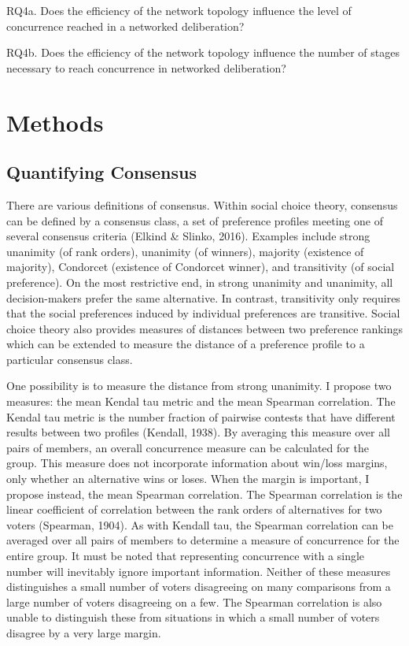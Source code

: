 RQ4a. Does the efficiency of the network topology influence the level of concurrence reached in a networked deliberation?

RQ4b. Does the efficiency of the network topology influence the number of stages necessary to reach concurrence in networked deliberation?

\section{Methods}
\subsection{Quantifying Consensus}
There are various definitions of consensus. Within social choice theory, consensus can be defined by a consensus class, a set of preference profiles meeting one of several consensus criteria (Elkind \& Slinko, 2016). Examples include strong unanimity (of rank orders), unanimity (of winners), majority (existence of majority), Condorcet (existence of Condorcet winner), and transitivity (of social preference). On the most restrictive end, in strong unanimity and unanimity, all decision-makers prefer the same alternative. In contrast, transitivity only requires that the social preferences induced by individual preferences are transitive. Social choice theory also provides measures of distances between two preference rankings which can be extended to measure the distance of a preference profile to a particular consensus class.

One possibility is to measure the distance from strong unanimity. I propose two measures: the mean Kendal tau metric and the mean Spearman correlation. The Kendal tau metric is the number fraction of pairwise contests that have different results between two profiles (Kendall, 1938). By averaging this measure over all pairs of members, an overall concurrence measure can be calculated for the group. This measure does not incorporate information about win/loss margins, only whether an alternative wins or loses. When the margin is important, I propose instead, the mean Spearman correlation. The Spearman correlation is the linear coefficient of correlation between the rank orders of alternatives for two voters (Spearman, 1904). As with Kendall tau, the Spearman correlation can be averaged over all pairs of members to determine a measure of concurrence for the entire group. It must be noted that representing concurrence with a single number will inevitably ignore important information. Neither of these measures distinguishes a small number of voters disagreeing on many comparisons from a large number of voters disagreeing on a few. The Spearman correlation is also unable to distinguish these from situations in which a small number of voters disagree by a very large margin.

